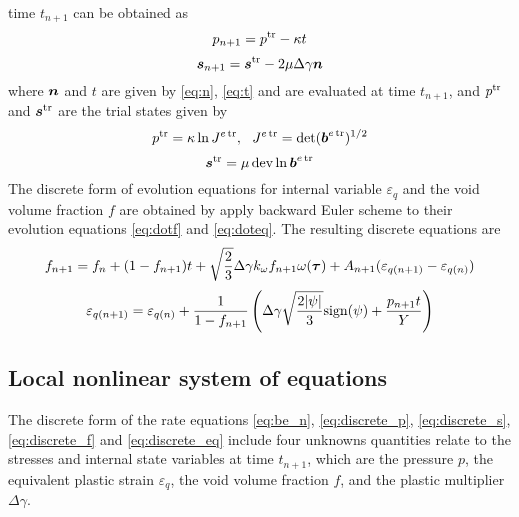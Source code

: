 time $t_{n+1}$ can be obtained as
%
\begin{equation}\label{eq:discrete_p}
p_{n+1} = p^{\operatorname{\text{tr}}} - \kappa t
\end{equation}
%
\begin{equation}\label{eq:discrete_s}
{\boldsymbol{s}}_{n+1} = {\boldsymbol{s}}^{\operatorname{\text{tr}}} - 2\mu\Delta\gamma {\boldsymbol{n}}
\end{equation}
%
where ${\boldsymbol{n}}$ and $t$ are given by \eqref{eq:n}, \eqref{eq:t} and 
are evaluated at time $t_{n+1}$, and $p^{\operatorname{\text{tr}}}$ and ${\boldsymbol{s}}^{\operatorname{\text{tr}}}$ are the 
trial states given by
%
\begin{equation}\label{eq:ptr}
p^{\operatorname{\text{tr}}} = \kappa\ln J^{e\operatorname{\text{tr}}},~~J^{e\operatorname{\text{tr}}} = \det({\boldsymbol{b}}^{e\operatorname{\text{tr}}})^{1/2}
\end{equation}
%
\begin{equation}\label{eq:str}
{\boldsymbol{s}}^{\operatorname{\text{tr}}} = \mu\operatorname{\text{dev}}\ln{\boldsymbol{b}}^{e\operatorname{\text{tr}}}
\end{equation}
%
The discrete form of evolution equations for internal variable 
$\varepsilon_q$ and the void volume fraction $f$ are obtained by apply 
backward Euler scheme to their evolution equations \eqref{eq:dotf} and 
\eqref{eq:doteq}. The resulting discrete equations are
%
\begin{equation}\label{eq:discrete_f}
f_{n+1} = f_n + (1-f_{n+1})t + \sqrt{\frac{2}{3}}\Delta\gamma
k_{\omega}f_{n+1} \omega({\boldsymbol{\tau}}) + A_{n+1}(\varepsilon_{q(n+1)} - 
\varepsilon_{q(n)})
\end{equation}
%
\begin{equation}\label{eq:discrete_eq}
\varepsilon_{q(n+1)} = \varepsilon_{q(n)} + \frac{1}{1-f_{n+1}}
\left(\Delta\gamma\sqrt{\frac{2|\psi|}{3}} {\rm sign}(\psi) + 
\frac{p_{n+1} t}{Y}\right)
\end{equation}


\subsection{Local nonlinear system of equations}
The discrete form of the rate equations \eqref{eq:be_n}, 
\eqref{eq:discrete_p}, \eqref{eq:discrete_s}, \eqref{eq:discrete_f} 
and \eqref{eq:discrete_eq} include four unknowns quantities relate to 
the stresses and internal state variables at time $t_{n+1}$, which 
are the pressure $p$, the equivalent plastic strain $\varepsilon_q$, 
the void volume fraction $f$, and the plastic multiplier $\Delta
\gamma$.

